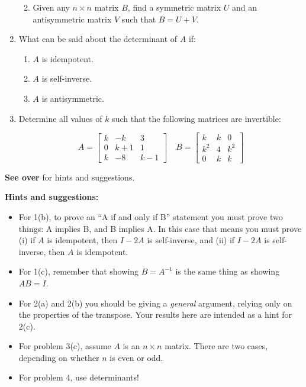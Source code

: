 \documentclass[letterpaper,12pt]{amsart}
\newcommand{\bbm}{\begin{bmatrix}}
\newcommand{\ebm}{\end{bmatrix}}
\begin{document}
\begin{enumerate}
\begin{enumerate}
\medskip

 \item Given any $n\times n$ matrix $B$, find a symmetric matrix $U$ and an antisymmetric matrix $V$ such that $B=U+V$.
\end{enumerate}

\bigskip

\item What can be said about the determinant of $A$ if:

\medskip

\begin{enumerate}
 \item $A$ is idempotent.

\medskip

 \item $A$ is self-inverse.

\medskip

 \item $A$ is antisymmetric.  
\end{enumerate}

\bigskip

\item Determine all values of $k$ such that the following matrices are invertible:

\medskip

\[
 A = \bbm k&-k&3\\0&k+1&1\\k&-8&k-1\ebm \quad B = \bbm k&k&0\\k^2&4&k^2\\0&k&k\ebm
\]

\end{enumerate}

\bigskip

\bigskip

{\bf See over} for hints and suggestions.

\newpage
\textbf{Hints and suggestions:}

\bigskip

\begin{itemize}
 \item For 1(b), to prove an ``A if and only if B'' statement you must prove two things: A implies B, and B implies A. In this case that means you must prove (i) if $A$ is idempotent, then $I-2A$ is self-inverse, and (ii) if $I-2A$ is self-inverse, then $A$ is idempotent.

\medskip
 \item For 1(c), remember that showing $B=A^{-1}$ is the same thing as showing $AB=I$.

\medskip
 \item For 2(a) and 2(b) you should be giving a \textit{general} argument, relying only on the properties of the transpose. Your results here are intended as a hint for 2(c).

\medskip

 \item For problem 3(c), assume $A$ is an $n\times n$ matrix. There are two cases, depending on whether $n$ is even or odd.

\medskip

 \item For problem 4, use determinants!
\end{itemize}
\end{document}
